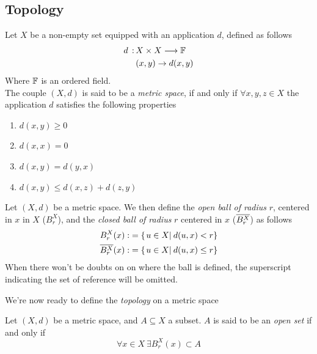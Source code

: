 \documentclass[../complete.tex]{subfiles}
\begin{document}
\subsection{Topology}
\begin{dfn}
	Let $X$ be a non-empty set equipped with an application $d$, defined as follows
	\begin{equation}
		\begin{aligned}
			d\, :\, &X\times X\overset{}{\longrightarrow}\mathbb{F}\\
			&(x,y)\to d(x,y)
		\end{aligned}
		\label{eq:distdef}
	\end{equation}
	Where $\mathbb{F}$ is an ordered field.\\
	The couple $(X,d)$ is said to be a \textit{metric space}, if and only if $\forall x,y,z\in X$ the application $d$ satisfies the following properties
	\begin{enumerate}
	\item $d(x,y)\ge0$
	\item $d(x,x)=0$
	\item $d(x,y)=d(y,x)$
	\item $d(x,y)\le  d(x,z)+d(z,y)$
	\end{enumerate}
\end{dfn}
\begin{dfn}[Ball]
	Let $(X,d)$ be a metric space. We then define the \textit{open ball of radius} $r$, centered in $x$ in $X$ ($B_r^X$), and the \textit{closed ball of radius} $r$ centered in $x$ ($\overline{B_r^X}$) as follows
	\begin{equation}
		\begin{aligned}
			B_r^X(x):&=\{\left.u\in X\right|_{}d(u,x)<r\}\\
			\overline{B_r^X}(x):&=\{\left.u\in X\right|_{}d(u,x)\le r\}
		\end{aligned}
		\label{eq:openclosedball}
	\end{equation}
	When there won't be doubts on on where the ball is defined, the superscript indicating the set of reference will be omitted.
\end{dfn}
We're now ready to define the \textit{topology} on a metric space
\begin{dfn}
	Let $(X,d)$ be a metric space, and $A\subseteq X$ a subset. $A$ is said to be an \textit{open set} if and only if
	\begin{equation}
		\forall x\in X\ \exists B_r^X(x)\subset A
		\label{eq:opensetdef}
	\end{equation}
\end{dfn}
\end{document}
